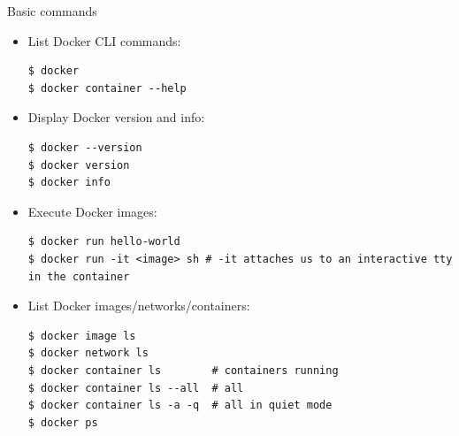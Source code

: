 
  

\begin{frame}[fragile]{Basic commands}
 \begin{itemize}
  \item List Docker CLI commands:
\begin{lstlisting}[language=shell]
$ docker
$ docker container --help
\end{lstlisting}

  \item Display Docker version and info:
\begin{lstlisting}[language=shell]
$ docker --version
$ docker version
$ docker info
\end{lstlisting}

  \item Execute Docker images:
\begin{lstlisting}[language=shell]
$ docker run hello-world
$ docker run -it <image> sh # -it attaches us to an interactive tty in the container
\end{lstlisting}

  \item List Docker images/networks/containers:
\begin{lstlisting}[language=shell]
$ docker image ls
$ docker network ls
$ docker container ls        # containers running
$ docker container ls --all  # all
$ docker container ls -a -q  # all in quiet mode
$ docker ps
\end{lstlisting}
 \end{itemize}
\end{frame}

